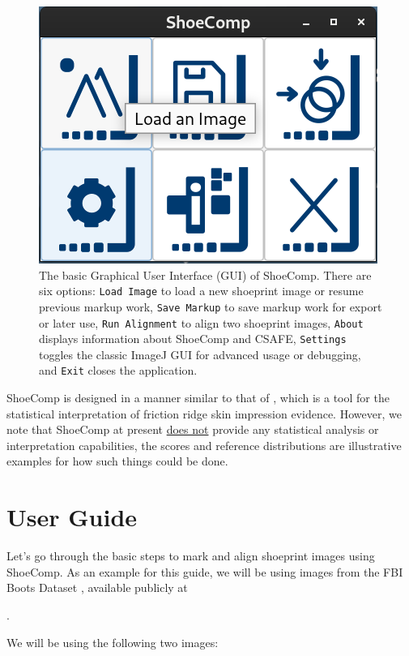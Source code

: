 \documentclass{csafedoc}
\begin{document}
\begin{figure}[htbp]
	\begin{center}
		\includegraphics[height=0.4\linewidth]{images/shoecomp.png}
	\end{center}
	\caption{The basic Graphical User Interface (GUI) of ShoeComp. There are six options:
		\texttt{Load Image} to load a new shoeprint image or resume previous markup work, \texttt{Save
			Markup} to save markup work for export or later use, \texttt{Run Alignment} to align two
		shoeprint images, \texttt{About} displays information about ShoeComp and CSAFE,
		\texttt{Settings} toggles the classic ImageJ GUI for advanced usage or debugging, and
		\texttt{Exit} closes the application.}
	\label{fig:shoecomp_base}
\end{figure}

ShoeComp is designed in a manner similar to that of
, which is a tool for the statistical
interpretation of friction ridge skin impression evidence. However, we note that ShoeComp
at present \underline{does not} provide any statistical analysis or interpretation
capabilities, the scores and reference distributions are illustrative examples for how
such things could be done.

\newpage
\chapter{User Guide}%
\label{sec:userguide}

Let's go through the basic steps to mark and align shoeprint images using ShoeComp. As an
example for this guide, we will be using images from the FBI Boots Dataset \cite{boots}, available
publicly at

\begin{center}
	.
\end{center}

We will be using the following two images:
\end{document}
